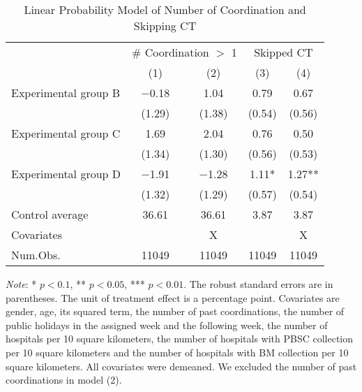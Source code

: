 \documentclass[12pt, a4paper]{article}
\begin{document}
\begin{table}[H]

\caption{\label{tab:lm-skip}Linear Probability Model of Number of Coordination and Skipping CT}
\centering
\fontsize{8}{10}\selectfont
\begin{threeparttable}
\begin{tabular}[t]{lcccc}
\toprule
\multicolumn{1}{c}{ } & \multicolumn{2}{c}{\# Coordination $>$ 1} & \multicolumn{2}{c}{Skipped CT} \\
\cmidrule(l{3pt}r{3pt}){2-3} \cmidrule(l{3pt}r{3pt}){4-5}
  & (1) & (2) & (3) & (4)\\
\midrule
Experimental group B & \num{-0.18} & \num{1.04} & \num{0.79} & \num{0.67}\\
 & (\num{1.29}) & (\num{1.38}) & (\num{0.54}) & (\num{0.56})\\
Experimental group C & \num{1.69} & \num{2.04} & \num{0.76} & \num{0.50}\\
 & (\num{1.34}) & (\num{1.30}) & (\num{0.56}) & (\num{0.53})\\
Experimental group D & \num{-1.91} & \num{-1.28} & \num{1.11}* & \num{1.27}**\\
 & (\num{1.32}) & (\num{1.29}) & (\num{0.57}) & (\num{0.54})\\
\midrule
Control average & 36.61 & 36.61 & 3.87 & 3.87\\
Covariates &  & X &  & X\\
Num.Obs. & \num{11049} & \num{11049} & \num{11049} & \num{11049}\\
\bottomrule
\end{tabular}
\begin{tablenotes}
\item \emph{Note}: * $p < 0.1$, ** $p < 0.05$, *** $p < 0.01$. The robust standard errors are in parentheses. The unit of treatment effect is a percentage point. Covariates are gender, age, its squared term, the number of past coordinations, the number of public holidays in the assigned week and the following week, the number of hospitals per 10 square kilometers, the number of hospitals with PBSC collection per 10 square kilometers and the number of hospitals with BM collection per 10 square kilometers. All covariates were demeaned. We excluded the number of past coordinations in model (2).
\end{tablenotes}
\end{threeparttable}
\end{table}
\end{document}
